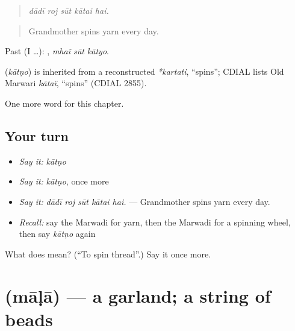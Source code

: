 \begin{quote}
    
\end{quote}

\begin{quote}
\emph{dādī roj sūt kātai hai.}
\end{quote}

\begin{quote}
Grandmother spins yarn every day.
\end{quote}

Past (I …):   , \emph{mhaĩ sūt kātyo}.

\begin{cousinweb}
\textbf{} (\emph{kātṇo}) is inherited from a reconstructed \emph{*kartati}, \textquotedblleft{}spins\textquotedblright{}; CDIAL lists Old Marwari \emph{kātaï}, \textquotedblleft{}spins\textquotedblright{} (CDIAL 2855).
\end{cousinweb}

\begin{grammarlens}[title={What you've built}]
One more word for this chapter.
\end{grammarlens}

\subsection*{Your turn}
\begin{itemize}
\raggedright
  \item \emph{Say it:} \emph{kātṇo}
  \item \emph{Say it:} \emph{kātṇo}, once more
  \item \emph{Say it:} \emph{dādī roj sūt kātai hai.} — Grandmother spins yarn every day.
  \item \emph{Recall:} say the Marwadi for yarn, then the Marwadi for a spinning wheel, then say \emph{kātṇo} again
\end{itemize}

\begin{tcolorbox}[breakable,colback=teal!4,colframe=teal!35!black,title={Before you move on}]
What does  mean? (\textquotedblleft{}To spin thread\textquotedblright{}.) Say it once more.
\end{tcolorbox}
\section[\texorpdfstring{\mw{माळा} (māḷā)}{माळा (māḷā)}]{ (māḷā) — a garland; a string of beads}

